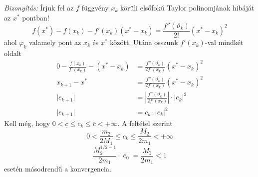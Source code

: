 \textit{Bizonyítás:}
Írjuk fel az $f$ függvény $x_{k}$ körüli elsőfokú Taylor polinomjának hibáját az $x^{*}$ pontban!
\begin{equation*}
    f(x^{*}) - f(x_{k}) - f'(x_{k})(x^{*} - x_{k}) = \frac{f''(\vartheta_{k})}{2!}(x^{*} - x_{k})^{2}
\end{equation*}
ahol $\varphi_{k}$ valamely pont az $x_{k}$ és $x^{*}$ között. Utána osszunk $f'(x_{k})$-val mindkét oldalt
\begin{align*}
    0 - \frac{f(x_{k})}{f'(x_{k})} - (x^{*} - x_{k}) & = \frac{f''(\vartheta_{k})}{2f'(x_{k})}(x^{*} - x_{k})^{2} \\
    x_{k+1} - x^{*} & = \frac{f''(\vartheta_{k})}{2f'(x_{k})}(x^{*} - x_{k})^{2} \\
    \lvert e_{k+1} \rvert & = \left\lvert  \frac{f''(\vartheta_{k})}{2f'(x_{k})}  \right\rvert \cdot \lvert e_{k} \rvert ^{2} \\
    \lvert e_{k+1} \rvert & = c_{k} \cdot \lvert e_{k} \rvert ^{2}
\end{align*}
Kell még, hogy $0 < \underline{c} \leq c_{k} \leq \overline c < + \infty$. A feltétel szerint
\begin{equation*}
    0 < \frac{m_{2}}{2M_{1}} \leq c_{k} \leq \frac{M_{2}}{2m_{1}} < + \infty
\end{equation*}
\begin{equation*}
    \frac{M_{2}^{1/2-1}}{2m_{1}} \cdot \lvert e_{0} \rvert  = \frac{M_{2}}{2m_{1}} < 1
\end{equation*}
esetén másodrendű a konvergencia.



